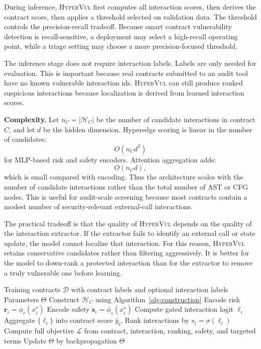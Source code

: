 \documentclass[conference]{IEEEtran}
\newcommand{\tool}{\textsc{HyperVul}}
\begin{document}
During inference, \tool{} first computes all interaction scores, then derives the contract score, then applies a threshold selected on validation data. The threshold controls the precision-recall tradeoff. Because smart contract vulnerability detection is recall-sensitive, a deployment may select a high-recall operating point, while a triage setting may choose a more precision-focused threshold.

The inference stage does not require interaction labels. Labels are only needed for evaluation. This is important because real contracts submitted to an audit tool have no known vulnerable interaction ids. \tool{} can still produce ranked suspicious interactions because localization is derived from learned interaction scores.

\textbf{Complexity.} Let $n_C=|\mathcal{H}_C|$ be the number of candidate interactions in contract $C$, and let $d$ be the hidden dimension. Hyperedge scoring is linear in the number of candidates:
\begin{equation}
O(n_C d^2)
\end{equation}
for MLP-based risk and safety encoders. Attention aggregation adds:
\begin{equation}
O(n_C d),
\end{equation}
which is small compared with encoding. Thus the architecture scales with the number of candidate interactions rather than the total number of AST or CFG nodes. This is useful for audit-scale screening because most contracts contain a modest number of security-relevant external-call interactions.

The practical tradeoff is that the quality of \tool{} depends on the quality of the interaction extractor. If the extractor fails to identify an external call or state update, the model cannot localize that interaction. For this reason, \tool{} retains conservative candidates rather than filtering aggressively. It is better for the model to down-rank a protected interaction than for the extractor to remove a truly vulnerable one before learning.

\begin{algorithm}[t]
\caption{\tool{} Training and Localization}
\label{alg:training}
\begin{algorithmic}[1]
\REQUIRE Training contracts $\mathcal{D}$ with contract labels and optional interaction labels
\ENSURE Parameters $\Theta$
        \STATE Construct $\mathcal{H}_C$ using Algorithm~\ref{alg:construction}
            \STATE Encode risk $\mathbf{r}_i=\phi_r(x_i^r)$
            \STATE Encode safety $\mathbf{s}_i=\phi_s(x_i^s)$
            \STATE Compute gated interaction logit $\ell_i$
        \ENDFOR
        \STATE Aggregate $\{\ell_i\}$ into contract score $\hat{y}_C$
        \STATE Rank interactions by $s_i=\sigma(\ell_i)$
    \ENDFOR
    \STATE Compute full objective $\mathcal{L}$ from contract, interaction, ranking, safety, and targeted terms
    \STATE Update $\Theta$ by backpropagation
\ENDFOR
\RETURN $\Theta$
\end{algorithmic}
\end{algorithm}
\end{document}

